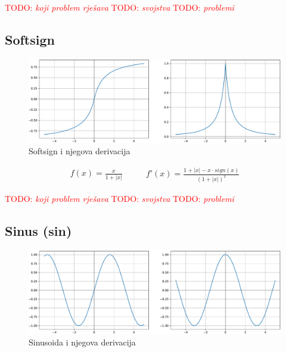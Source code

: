 \documentclass[times, utf8, numeric, diplomski]{fer}
\def\TODO#1{\noindent\textcolor{red}{TODO: \textit{#1}}\newline}
\def\todo#1{\TODO{#1}}
\begin{document}
\todo{koji problem rješava}
\todo{svojstva}
\todo{problemi}
\fi %

\subsection{Softsign}

\begin{figure}[H]
\includegraphics[width=\textwidth]{Softsign.pdf}
\centering
\caption{Softsign i njegova derivacija}
\label{fig:softsign}
\end{figure}

\begin{equation}
\label{eq:softsign}
\begin{split}
f(x) = \frac{x}{1+|x|}
\end{split}
\qquad
\begin{split}
f'(x) = \frac{1 + |x| - x \cdot sign(x)}{(1+|x|)^2}
\end{split}
\end{equation}

\todo{koji problem rješava}
\todo{svojstva}
\todo{problemi}

\subsection{Sinus (sin)}

\begin{figure}[H]
\includegraphics[width=\textwidth]{Sin.pdf}
\centering
\caption{Sinusoida i njegova derivacija}
\label{fig:sin}
\end{figure}
\end{document}

